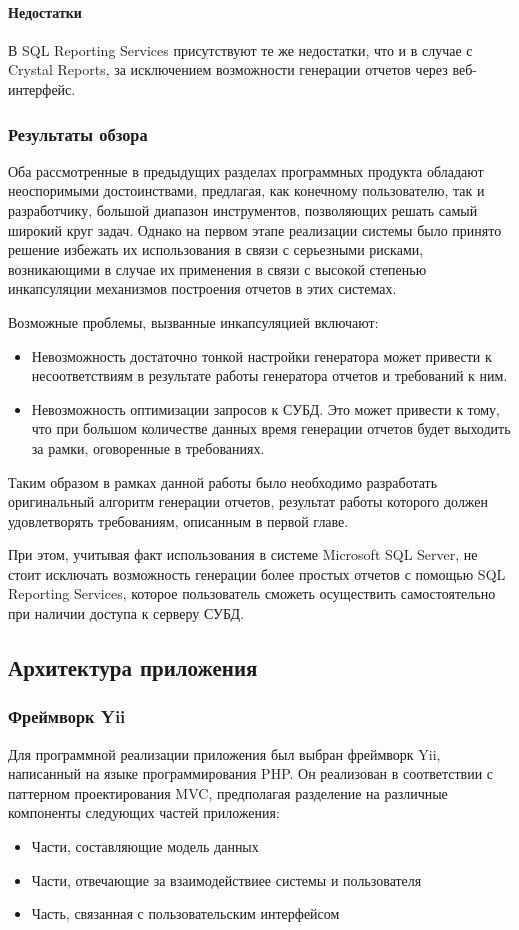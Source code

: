 \paragraph{Недостатки} В SQL Reporting Services присутствуют те же недостатки, что и в случае
с Crystal Reports, за исключением возможности генерации отчетов через веб-интерфейс.

\subsubsection{Результаты обзора}
Оба рассмотренные в предыдущих разделах программных продукта 
обладают неоспоримыми достоинствами, предлагая, как конечному пользователю, так и разработчику,
большой диапазон инструментов, позволяющих решать самый широкий круг задач.
Однако на первом этапе реализации системы было принято решение избежать их использования
в связи с серьезными рисками, возникающими в случае их применения в связи с
высокой степенью инкапсуляции механизмов построения отчетов в этих системах.

Возможные проблемы, вызванные инкапсуляцией включают:
\begin{itemize}
\item{
Невозможность достаточно тонкой настройки генератора может привести к несоответствиям в результате
работы генератора отчетов и требований к ним.
}
\item{
Невозможность оптимизации запросов к СУБД. Это может привести к тому, что при большом количестве данных
время генерации отчетов будет выходить за рамки, оговоренные в требованиях.
}
\end{itemize}

Таким образом в рамках данной работы было необходимо разработать оригинальный 
алгоритм генерации отчетов, результат работы которого должен удовлетворять требованиям,
описанным в первой главе.

При этом, учитывая факт использования в системе Microsoft SQL Server, не стоит исключать
возможность генерации более простых отчетов с помощью SQL Reporting Services, которое
пользователь сможеть осуществить самостоятельно при наличии доступа к серверу СУБД.

\subsection{Архитектура приложения}


\subsubsection{Фреймворк Yii}
Для программной реализации приложения был выбран фреймворк Yii\cite{yii}, написанный на языке
программирования PHP. Он реализован в соответствии с паттерном проектирования MVC\cite{gamma},
предполагая разделение на различные компоненты следующих частей приложения:
\begin{itemize}
\item{
Части, составляющие модель данных
}
\item{
Части, отвечающие за взаимодействиее системы и пользователя
}
\item{ 
Часть, связанная с пользовательским интерфейсом
}
\end{itemize}

